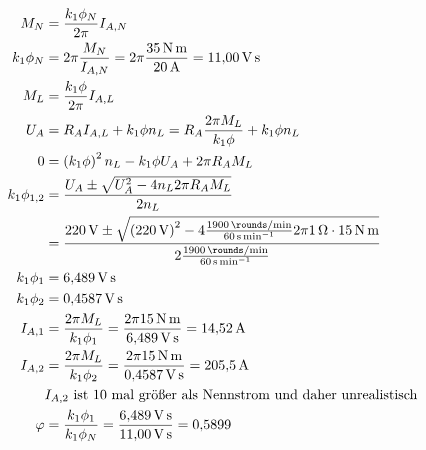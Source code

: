 \documentclass[11pt,a4paper]{scrartcl}
\newcommand{\mybr}[1]{\left(#1\right)}
\newcommand{\0}{_{\mybr{0}}}
\newcommand{\1}{_{\mybr{1}}}
\newcommand{\2}{_{\mybr{2}}}
\begin{document}
\section{}
\begin{align}
M_N&=\frac{k_1 \phi_N}{2\pi} I_{A,N}\\
k_1\phi_N&=2\pi\frac{M_N}{I_{A,N}}=2\pi\frac{\SI{35}{\newton\metre}}{\SI{20}{\ampere}}=\SI{11.00}{\volt\second}\\
M_L&=\frac{k_1 \phi}{2\pi} I_{A,L}\\
U_A&=R_A I_{A,L}+k_1\phi n_L=R_A \frac{2\pi M_L}{k_1\phi}+k_1\phi n_L\\
0&=\mybr{k_1\phi}^2 n_L - k_1 \phi U_A + 2\pi R_A M_L\\
k_1\phi_{1,2}&=\frac{U_A\pm\sqrt{U_A^2-4n_L 2 \pi R_A M_L}}{2 n_L}\\
&=\frac{\SI{220}{\volt}\pm\sqrt{\mybr{\SI{220}{\volt}}^2-4\frac{\SI{1900}{\rounds\per\minute}}{\SI{60}{\second\per\minute}}2\pi\SI{1}{\ohm}\cdot\SI{15}{\newton\metre}}}{2\frac{\SI{1900}{\rounds\per\minute}}{\SI{60}{\second\per\minute}}}\\
k_1\phi_1&=\SI{6.489}{\volt\second}\\
k_1\phi_2&=\SI{0.4587}{\volt\second}\\
I_{A,1}&=\frac{2\pi M_L}{k_1\phi_1}=\frac{2\pi\SI{15}{\newton\metre}}{\SI{6.489}{\volt\second}}=\SI{14.52}{\ampere}\\
I_{A,2}&=\frac{2\pi M_L}{k_1\phi_2}=\frac{2\pi\SI{15}{\newton\metre}}{\SI{0.4587}{\volt\second}}=\SI{205.5}{\ampere}\\
&\text{$I_{A,2}$ ist 10 mal größer als Nennstrom und daher unrealistisch}\\
\varphi&=\frac{k_1\phi_1}{k_1\phi_N}=\frac{\SI{6.489}{\volt\second}}{\SI{11.00}{\volt\second}}=\num{0.5899}
\end{align}

\section{}
\end{document}

